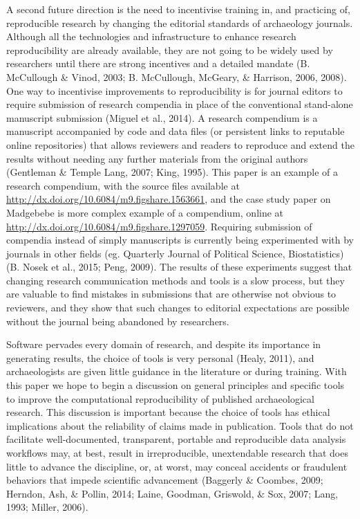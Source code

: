 \documentclass[american,man]{apa6}
\newcounter{author}
\begin{document}
A second future direction is the need to incentivise training in, and
practicing of, reproducible research by changing the editorial standards
of archaeology journals. Although all the technologies and
infrastructure to enhance research reproducibility are already
available, they are not going to be widely used by researchers until
there are strong incentives and a detailed mandate (B. {McCullough} \&
Vinod, 2003; B. {McCullough}, {McGeary}, \& Harrison, 2006, 2008). One
way to incentivise improvements to reproducibility is for journal
editors to require submission of research compendia in place of the
conventional stand-alone manuscript submission (Miguel et al., 2014). A
research compendium is a manuscript accompanied by code and data files
(or persistent links to reputable online repositories) that allows
reviewers and readers to reproduce and extend the results without
needing any further materials from the original authors (Gentleman \&
Temple Lang, 2007; King, 1995). This paper is an example of a research
compendium, with the source files available at
\url{http://dx.doi.org/10.6084/m9.figshare.1563661}, and the case study
paper on Madgebebe is more complex example of a compendium, online at
\url{http://dx.doi.org/10.6084/m9.figshare.1297059}. Requiring
submission of compendia instead of simply manuscripts is currently being
experimented with by journals in other fields (eg. Quarterly Journal of
Political Science, Biostatistics) (B. Nosek et al., 2015; Peng, 2009).
The results of these experiments suggest that changing research
communication methods and tools is a slow process, but they are valuable
to find mistakes in submissions that are otherwise not obvious to
reviewers, and they show that such changes to editorial expectations are
possible without the journal being abandoned by researchers.

Software pervades every domain of research, and despite its importance
in generating results, the choice of tools is very personal (Healy,
2011), and archaeologists are given little guidance in the literature or
during training. With this paper we hope to begin a discussion on
general principles and specific tools to improve the computational
reproducibility of published archaeological research. This discussion is
important because the choice of tools has ethical implications about the
reliability of claims made in publication. Tools that do not facilitate
well-documented, transparent, portable and reproducible data analysis
workflows may, at best, result in irreproducible, unextendable research
that does little to advance the discipline, or, at worst, may conceal
accidents or fraudulent behaviors that impede scientific advancement
(Baggerly \& Coombes, 2009; Herndon, Ash, \& Pollin, 2014; Laine,
Goodman, Griswold, \& Sox, 2007; Lang, 1993; Miller, 2006).
\end{document}
